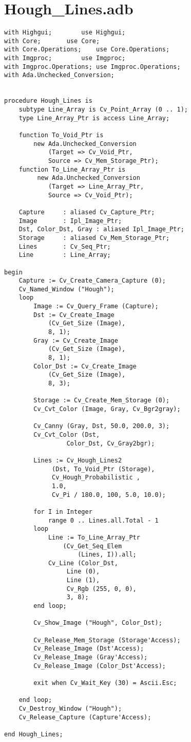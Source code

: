 \chapter{Hough_Lines.adb}
\begin{lstlisting}
with Highgui;		 use Highgui;
with Core;		 use Core;
with Core.Operations;	 use Core.Operations;
with Imgproc;		 use Imgproc;
with Imgproc.Operations; use Imgproc.Operations;
with Ada.Unchecked_Conversion;


procedure Hough_Lines is
	subtype Line_Array is Cv_Point_Array (0 .. 1);
	type Line_Array_Ptr is access Line_Array;

	function To_Void_Ptr is 
		new Ada.Unchecked_Conversion 
			(Target => Cv_Void_Ptr,
			Source => Cv_Mem_Storage_Ptr);
	function To_Line_Array_Ptr is 
		 new Ada.Unchecked_Conversion 
			(Target => Line_Array_Ptr,
			Source => Cv_Void_Ptr);

	Capture 	: aliased Cv_Capture_Ptr;
	Image 		: Ipl_Image_Ptr;
	Dst, Color_Dst, Gray : aliased Ipl_Image_Ptr;
	Storage 	: aliased Cv_Mem_Storage_Ptr;
	Lines 		: Cv_Seq_Ptr;
	Line 		: Line_Array;

begin
	Capture := Cv_Create_Camera_Capture (0);
	Cv_Named_Window ("Hough");
	loop
		Image := Cv_Query_Frame (Capture);
		Dst := Cv_Create_Image 
			(Cv_Get_Size (Image), 
			8, 1);
		Gray := Cv_Create_Image 
			(Cv_Get_Size (Image), 
			8, 1);
		Color_Dst := Cv_Create_Image 
			(Cv_Get_Size (Image), 
			8, 3);

		Storage := Cv_Create_Mem_Storage (0);
		Cv_Cvt_Color (Image, Gray, Cv_Bgr2gray);

		Cv_Canny (Gray, Dst, 50.0, 200.0, 3);
		Cv_Cvt_Color (Dst, 
			     Color_Dst, Cv_Gray2bgr);

		Lines := Cv_Hough_Lines2 
			 (Dst, To_Void_Ptr (Storage),
			 Cv_Hough_Probabilistic , 
			 1.0, 
			 Cv_Pi / 180.0, 100, 5.0, 10.0);

		for I in Integer 
			range 0 .. Lines.all.Total - 1
		loop
			Line := To_Line_Array_Ptr 
				(Cv_Get_Seq_Elem 
					(Lines, I)).all;
			Cv_Line (Color_Dst, 
				 Line (0), 
				 Line (1), 
				 Cv_Rgb (255, 0, 0), 
				 3, 8);
		end loop;

		Cv_Show_Image ("Hough", Color_Dst);
	
		Cv_Release_Mem_Storage (Storage'Access);
		Cv_Release_Image (Dst'Access);
		Cv_Release_Image (Gray'Access);
		Cv_Release_Image (Color_Dst'Access);

		exit when Cv_Wait_Key (30) = Ascii.Esc;

	end loop;
	Cv_Destroy_Window ("Hough");
	Cv_Release_Capture (Capture'Access);

end Hough_Lines;
\end{lstlisting}